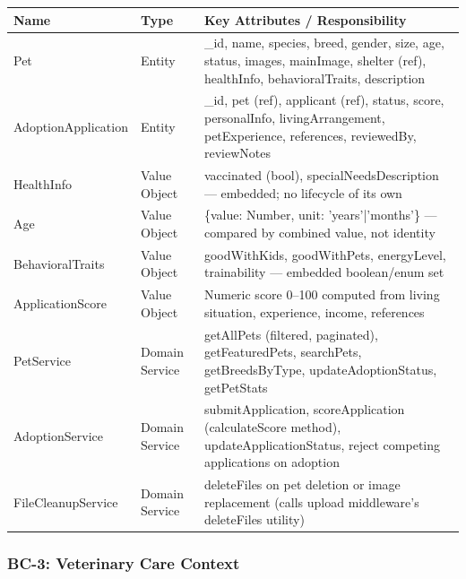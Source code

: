 \documentclass[12pt,a4paper]{article}
\begin{document}
\begin{center}
\begin{tabular}{@{}p{3.5cm}p{2cm}p{8.5cm}@{}}
\toprule
\textbf{Name} & \textbf{Type} & \textbf{Key Attributes / Responsibility} \\
\midrule
Pet & Entity & \_id, name, species, breed, gender, size, age, status, images, mainImage, shelter (ref), healthInfo, behavioralTraits, description \\
AdoptionApplication & Entity & \_id, pet (ref), applicant (ref), status, score, personalInfo, livingArrangement, petExperience, references, reviewedBy, reviewNotes \\
HealthInfo & Value Object & vaccinated (bool), specialNeedsDescription — embedded; no lifecycle of its own \\
Age & Value Object & \{value: Number, unit: 'years'|'months'\} — compared by combined value, not identity \\
BehavioralTraits & Value Object & goodWithKids, goodWithPets, energyLevel, trainability — embedded boolean/enum set \\
ApplicationScore & Value Object & Numeric score 0--100 computed from living situation, experience, income, references \\
PetService & Domain Service & getAllPets (filtered, paginated), getFeaturedPets, searchPets, getBreedsByType, updateAdoptionStatus, getPetStats \\
AdoptionService & Domain Service & submitApplication, scoreApplication (calculateScore method), updateApplicationStatus, reject competing applications on adoption \\
FileCleanupService & Domain Service & deleteFiles on pet deletion or image replacement (calls upload middleware's deleteFiles utility) \\
\bottomrule
\end{tabular}
\end{center}

\subsubsection{BC-3: Veterinary Care Context}
\end{document}
